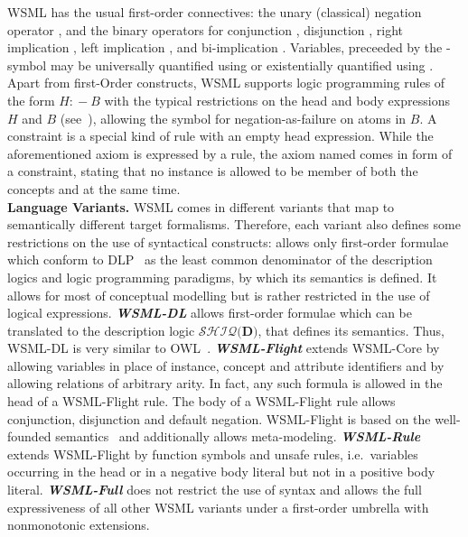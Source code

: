 WSML has the usual first-order connectives: the unary (classical)
negation operator , and the binary operators for
conjunction , disjunction , right implication
, left implication , and
bi-implication . Variables, preceeded by the
-symbol may be universally quantified using
 or existentially quantified using . Apart
from first-Order constructs, WSML supports logic programming rules
of the form $H :\!- B$ with the typical restrictions on the head and
body expressions $H$ and $B$ (see~\cite{wsml-spec}), allowing the
symbol  for negation-as-failure on atoms in $B$. A
constraint is a special kind of rule with an empty head expression.
While the aforementioned axiom is expressed by a rule, the axiom
named  comes in
form of a constraint, stating that no instance is allowed to be
member of both the concepts  and
 at the same time.\\[2mm]
{\bfseries Language Variants.} WSML comes in different variants that
map to semantically different target formalisms. Therefore, each
variant also defines some restrictions on the use of syntactical
constructs:  allows only
first-order formulae which conform to DLP~\cite{dlp} as the least
common denominator of the description logics and logic programming
paradigms, by which its semantics is defined. It allows for most of
conceptual modelling but is rather restricted in the use of logical
expressions. {\sl \bfseries WSML-DL} allows first-order formulae
which can be translated to the description logic
$\mathcal{SHIQ}(\mathbf{D)}$, that defines its semantics. Thus,
WSML-DL is very similar to
OWL~\cite{Dean+Schreiber-OntoLangRefe:04}. {\sl \bfseries
WSML-Flight} extends WSML-Core by allowing variables in place of
instance, concept and attribute identifiers and by allowing
relations of arbitrary arity. In fact, any such formula is allowed
in the head of a WSML-Flight rule. The body of a WSML-Flight rule
allows conjunction, disjunction and default negation. WSML-Flight is
based on the well-founded
semantics~\cite{Gelder+RossETAL-WellSemaGeneLogi:91} and
additionally allows meta-modeling. {\sl \bfseries WSML-Rule} extends
WSML-Flight by function symbols and unsafe rules, i.e.\ variables
occurring in the head or in a negative body literal but not in a
positive body literal. {\sl \bfseries WSML-Full} does not restrict
the use of syntax and allows the full expressiveness of all other
WSML variants under a first-order umbrella with nonmonotonic
extensions.

